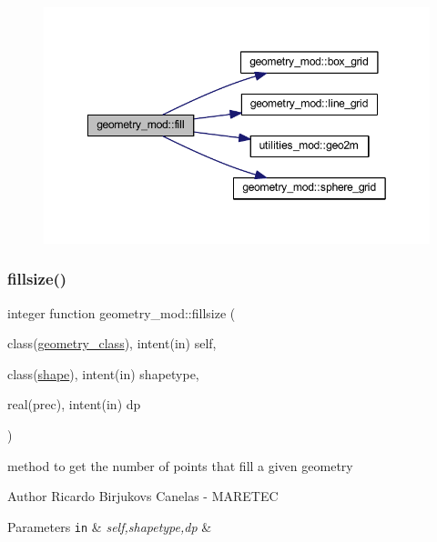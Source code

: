 \begin{figure}[H]
\begin{center}
\leavevmode
\includegraphics[width=349pt]{namespacegeometry__mod_a1d97564e04562532b5389bfb91aa676b_cgraph}
\end{center}
\end{figure}
\mbox{\label{namespacegeometry__mod_ad790edd694561b33dad20cfa3a14e8f2}} 
\subsubsection{\texorpdfstring{fillsize()}{fillsize()}}
{\footnotesize\ttfamily integer function geometry\+\_\+mod\+::fillsize (\begin{DoxyParamCaption}\item[{class(\mbox{\hyperlink{structgeometry__mod_1_1geometry__class}{geometry\+\_\+class}}), intent(in)}]{self,  }\item[{class(\mbox{\hyperlink{structgeometry__mod_1_1shape}{shape}}), intent(in)}]{shapetype,  }\item[{real(prec), intent(in)}]{dp }\end{DoxyParamCaption})\hspace{0.3cm}{\ttfamily [private]}}



method to get the number of points that fill a given geometry 

\begin{DoxyAuthor}{Author}
Ricardo Birjukovs Canelas -\/ M\+A\+R\+E\+T\+EC 
\end{DoxyAuthor}

\begin{DoxyParams}[1]{Parameters}
\mbox{\tt in}  & {\em self,shapetype,dp} & \\
\hline
\end{DoxyParams}


